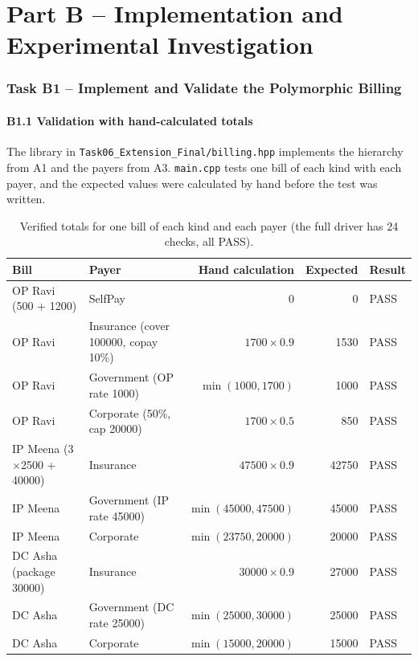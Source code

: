\documentclass[11pt,a4paper]{article}
\begin{document}
\part*{Part B -- Implementation and Experimental Investigation}

\section{Task B1 -- Implement and Validate the Polymorphic Billing}
\subsection*{B1.1 Validation with hand-calculated totals}
The library in \texttt{Task06\_Extension\_Final/billing.hpp} implements the hierarchy from A1 and the payers from A3. \texttt{main.cpp} tests one bill of each kind with each payer, and the expected values were calculated by hand before the test was written.

\begin{table}[H]
\centering
\small
\begin{tabular}{@{}llrrl@{}}
\toprule
\textbf{Bill} & \textbf{Payer} & \textbf{Hand calculation} & \textbf{Expected} & \textbf{Result} \\
\midrule
OP Ravi (500 + 1200) & SelfPay & 0 & 0 & PASS \\
OP Ravi & Insurance (cover 100000, copay 10\%) & $1700 \times 0.9$ & 1530 & PASS \\
OP Ravi & Government (OP rate 1000) & $\min(1000, 1700)$ & 1000 & PASS \\
OP Ravi & Corporate (50\%, cap 20000) & $1700 \times 0.5$ & 850 & PASS \\
IP Meena (3$\times$2500 + 40000) & Insurance & $47500 \times 0.9$ & 42750 & PASS \\
IP Meena & Government (IP rate 45000) & $\min(45000, 47500)$ & 45000 & PASS \\
IP Meena & Corporate & $\min(23750, 20000)$ & 20000 & PASS \\
DC Asha (package 30000) & Insurance & $30000 \times 0.9$ & 27000 & PASS \\
DC Asha & Government (DC rate 25000) & $\min(25000, 30000)$ & 25000 & PASS \\
DC Asha & Corporate & $\min(15000, 20000)$ & 15000 & PASS \\
\bottomrule
\end{tabular}
\caption{Verified totals for one bill of each kind and each payer (the full driver has 24 checks, all PASS).}
\end{table}
\end{document}
